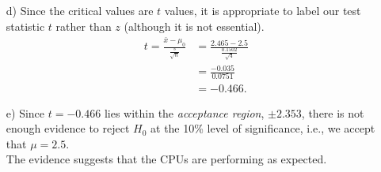 \documentclass[12pt]{article}
\begin{document}
{\begin{minipage}[t]{0.98\textwidth}
\begin{minipage}[t]{0.47\textwidth}
\begin{enumerate}
\item[d)] Since the critical values are $t$ values, it is appropriate to label our test statistic $t$ rather than $z$ (although it is not essential).
    \begin{align*}
    t = \frac{\bar x - \mu_0}{\frac{s}{\sqrt{n}}} &= \frac{2.465 - 2.5}{\frac{0.1502}{\sqrt{4}}} \\[0.2cm]
    &= \frac{-0.035}{0.0751} \\[0.2cm]
    &=  -0.466.
    \end{align*}
\item[e)] Since $t=-0.466$ lies within the \emph{acceptance region}, $\pm 2.353$, there is not enough evidence to reject $H_0$ at the 10\% level of significance, i.e., we accept that $\mu = 2.5$.\\[0.4cm]
    The evidence suggests that the CPUs are performing as expected.
\end{enumerate}
\end{minipage}
\end{minipage}}\vspace{0.03\textwidth}
\end{document}
